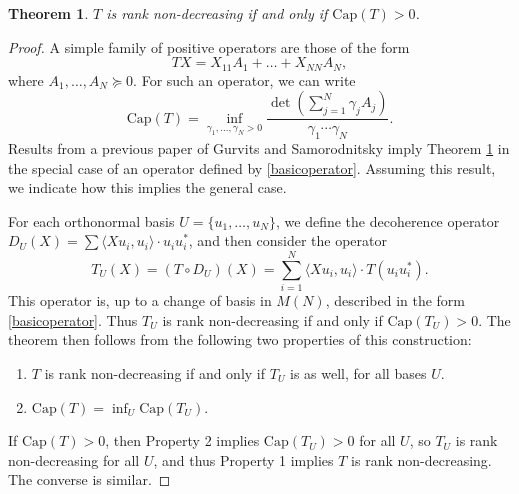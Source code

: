 \documentclass[12pt]{article}
\newtheorem{theorem}{Theorem}
\begin{document}
\begin{theorem} \label{rankdecreasingcapacitytheorem}
    $T$ is rank non-decreasing if and only if $\text{Cap}(T) > 0$.
\end{theorem}
\begin{proof}
    A simple family of positive operators are those of the form
    \begin{equation} \label{basicoperator}
        TX = X_{11} A_1 + \dots + X_{NN} A_N,
    \end{equation}
    where $A_1,\dots,A_N \succeq 0$. For such an operator, we can write
    \[ \text{Cap}(T) = \inf_{\gamma_1, \dots, \gamma_N > 0} \frac{\det ( \sum_{j = 1}^N \gamma_j A_j )}{\gamma_1 \cdots \gamma_N}. \]
    Results from a previous paper of Gurvits and Samorodnitsky \cite{gurvits3} imply Theorem \ref{rankdecreasingcapacitytheorem} in the special case of an operator defined by \eqref{basicoperator}. Assuming this result, we indicate how this implies the general case.

    For each orthonormal basis $U = \{ u_1, \dots, u_N \}$, we define the decoherence operator $D_U(X) = \sum \langle Xu_i, u_i \rangle \cdot u_i u_i^*$, and then consider the operator
    \[ T_U(X) = (T \circ D_U)(X) = \sum_{i=1}^N \langle X u_i, u_i \rangle \cdot T(u_i u_i^*). \]
    This operator is, up to a change of basis in $M(N)$, described in the form \eqref{basicoperator}. Thus $T_U$ is rank non-decreasing if and only if $\text{Cap}(T_U) > 0$. The theorem then follows from the following two properties of this construction:
    \begin{enumerate}
        \item $T$ is rank non-decreasing if and only if $T_U$ is as well, for all bases $U$.
        \item $\text{Cap}(T) = \inf_U \text{Cap}(T_U)$.
    \end{enumerate}
    If $\text{Cap}(T) > 0$, then Property 2 implies $\text{Cap}(T_U) > 0$ for all $U$, so $T_U$ is rank non-decreasing for all $U$, and thus Property 1 implies $T$ is rank non-decreasing. The converse is similar.


\end{proof}
\end{document}
